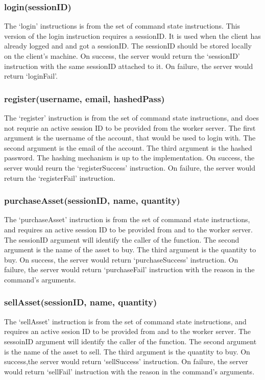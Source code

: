 \documentclass[a4paper]{article}
\begin{document}
\subsubsection{login(sessionID)}
The `login' instructions is from the set of command state instructions. This
version of the login instruction requires a sessionID. It is used when the
client has already logged and and got a sessionID. The sessionID should be
stored locally on the client's machine. On success, the server would return the
`sessionID' instruction with the same sessionID attached to it. On failure, the
server would return `loginFail'.

\subsubsection{register(username, email, hashedPass)}
The `register' instruction is from the set of command state instructions, and
does not requrie an active session ID to be provided from the worker server.
The first argument is the username of the account, that would be used to login
with. The second argument is the email of the account. The third argument is
the hashed password. The hashing mechanism is up to the implementation. On
success, the server would reurn the `registerSuccess' instruction. On failure,
the server would return the `registerFail' instruction.

\subsubsection{purchaseAsset(sessionID, name, quantity)}
The `purchaseAsset' instruction is from the set of command state instructions,
and requires an active session ID to be provided from and to the worker server.
The sessionID argument will identify the caller of the function. The second
argument is the name of the asset to buy. The third argument is the quantity to
buy. On success, the server would return `purchaseSuccess' instruction. On
failure, the server would return `purchaseFail' instruction with the reason
in the command's arguments.

\subsubsection{sellAsset(sessionID, name, quantity)}
The `sellAsset' instruction is from the set of command state instructions, and
requires an active sesion ID to be provided from and to the worker server. The
sessoinID argument will identify the caller of the function. The second
argument is the name of the asset to sell. The third argument is the quantity
to buy. On success,the server would return `sellSuccess' instruction. On
failure, the server would return `sellFail' instruction with the reason in
the command's arguments.
\end{document}
